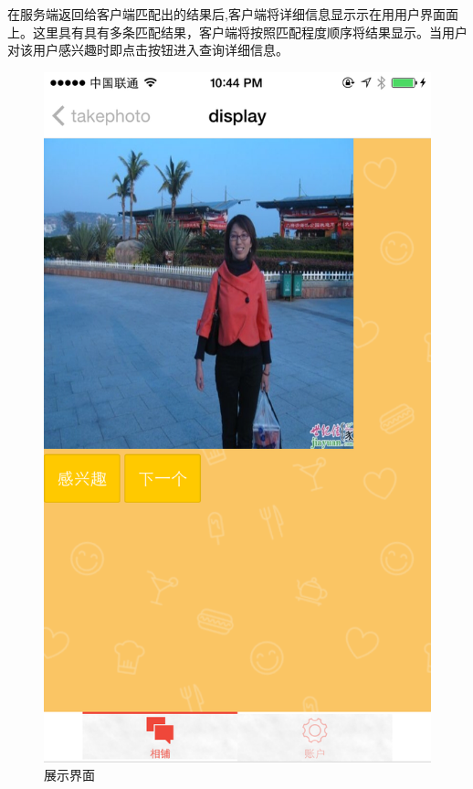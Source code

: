 在服务端返回给客户端匹配出的结果后,客户端将详细信息显⽰示在⽤用户界⾯面上。这里具有具有多条匹配结果，客户端将按照匹配程度顺序将结果显⽰。当用户对该用户感兴趣时即点击按钮进入查询详细信息。\parencite{biber}

\begin{figure}[h] 
\begin{minipage}[t]{0.45\linewidth}
\centering
\includegraphics[width=\textwidth]{img/chap4/display.PNG}
\caption{展示界面\label{instagram}}
\end{minipage}


\end{figure}




